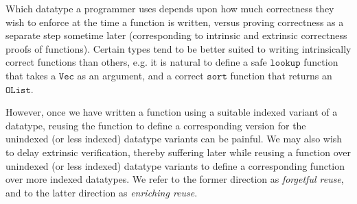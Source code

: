 \documentclass[acmsmall]{acmart}\settopmatter{}
\newcommand{\txt}[1]{\ensuremath{\texttt{#1}}}
\begin{document}
Which datatype a programmer uses depends upon how much correctness
they wish to enforce at the time a function is written, versus proving
correctness as a separate step sometime later (corresponding to
intrinsic and extrinsic correctness proofs of functions). Certain
types tend to be better suited to writing intrinsically correct
functions than others, e.g. it is natural to define a safe \txt{lookup}
function that takes a \txt{Vec} as an argument, and a correct \txt{sort}
function that returns an \txt{OList}.

However, once we have written a function using a suitable indexed
variant of a datatype, reusing the function to define a corresponding version
for the unindexed (or less indexed) datatype variants can be
painful. We may also wish to delay extrinsic verification, thereby
suffering later while reusing a function over unindexed (or less
indexed) datatype variants to define a corresponding function over
more indexed datatypes. We refer to the former direction as
\textit{forgetful reuse}, and to the latter direction as
\textit{enriching reuse}.
\end{document}
